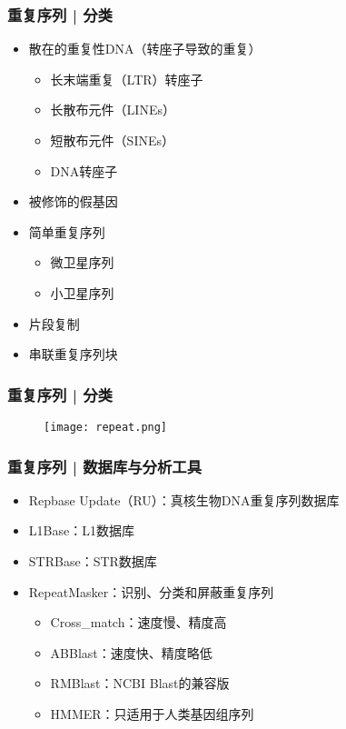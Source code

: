 \begin{frame}
  \frametitle{重复序列 | 分类}
  \begin{itemize}
    \item 散在的重复性DNA（转座子导致的重复）
      \begin{itemize}
	\item 长末端重复（LTR）转座子
	\item 长散布元件（LINEs）
	\item 短散布元件（SINEs）
	\item DNA转座子
      \end{itemize}
    \item 被修饰的假基因
    \item 简单重复序列
      \begin{itemize}
	\item 微卫星序列
	\item 小卫星序列
      \end{itemize}
    \item 片段复制
    \item 串联重复序列块
  \end{itemize}
\end{frame}

\begin{frame}
  \frametitle{重复序列 | 分类}
  \begin{figure}
    \centering
    \texttt{[image: repeat.png]}
  \end{figure}
\end{frame}

\begin{frame}
  \frametitle{重复序列 | 数据库与分析工具}
  \begin{itemize}
    \item Repbase Update（RU）：真核生物DNA重复序列数据库
    \item L1Base：L1数据库
    \item STRBase：STR数据库
    \item RepeatMasker：识别、分类和屏蔽重复序列
      \begin{itemize}
        \item Cross\_match：速度慢、精度高
        \item ABBlast：速度快、精度略低
        \item RMBlast：NCBI Blast的兼容版
        \item HMMER：只适用于人类基因组序列
      \end{itemize}
  \end{itemize}
\end{frame}

